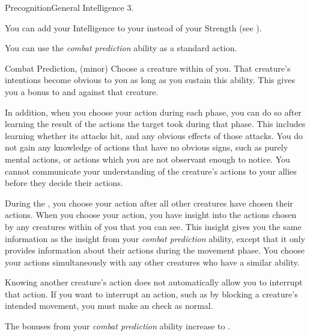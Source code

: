     \begin{feat}{Precognition}{General}
        \featpre Intelligence 3.

         You can add your Intelligence to your  instead of your Strength (see ).

         You can use the \textit{combat prediction} ability as a standard action.
        \begin{sustainability}{Combat Prediction}{,  (minor)}
            \rankline
            Choose a creature within \medrange of you.
            That creature's intentions become obvious to you as long as you sustain this ability.
            This gives you a  bonus to  and  against that creature.

            In addition, when you choose your action during each phase, you can do so after learning the result of the actions the target took during that phase.
            This includes learning whether its attacks hit, and any obvious effects of those attacks.
            You do not gain any knowledge of actions that have no obvious signs, such as purely mental actions, or actions which you are not observant enough to notice.
            You cannot communicate your understanding of the creature's actions to your allies before they decide their actions.
        \end{sustainability}

         During the , you choose your action after all other creatures have chosen their actions.
        When you choose your action, you have insight into the actions chosen by any creatures within \longrange of you that you can see.
        This insight gives you the same information as the insight from your \textit{combat prediction} ability, except that it only provides information about their actions during the movement phase.
        You choose your actions simultaneously with any other creatures who have a similar ability.

        Knowing another creature's action does not automatically allow you to interrupt that action.
        If you want to interrupt an action, such as by blocking a creature's intended movement, you must make an  check as normal.

         The bonuses from your \textit{combat prediction} ability increase to .
    \end{feat}

